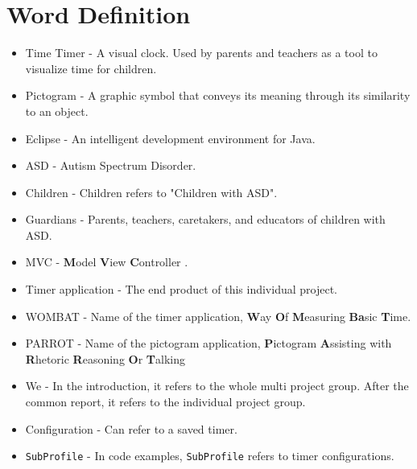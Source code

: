 \chapter*{Word Definition}

\begin{itemize}

	\item Time Timer - A visual clock. Used by parents and teachers as a tool to visualize time for children.
	\item Pictogram - A graphic symbol that conveys its meaning through its similarity to an object.
	\item Eclipse - An intelligent development environment for Java.
	\item ASD - Autism Spectrum Disorder.
	\item Children - Children refers to "Children with ASD".
	\item Guardians - Parents, teachers, caretakers, and educators of children with ASD.
	\item MVC - \textbf{M}odel \textbf{V}iew \textbf{C}ontroller \cite{MVC}.
	\item Timer application - The end product of this individual project.
	\item WOMBAT - Name of the timer application, \textbf{W}ay \textbf{O}f \textbf{M}easuring \textbf{Ba}sic \textbf{T}ime.
	\item PARROT - Name of the pictogram application, \textbf{P}ictogram \textbf{A}ssisting with \textbf{R}hetoric \textbf{R}easoning \textbf{O}r \textbf{T}alking
	\item We - In the introduction, it refers to the whole multi project group. After the common report, it refers to the individual project group.
	\item Configuration - Can refer to a saved timer.
	\item \texttt{SubProfile} - In code examples, \texttt{SubProfile} refers to timer configurations.

\end{itemize}